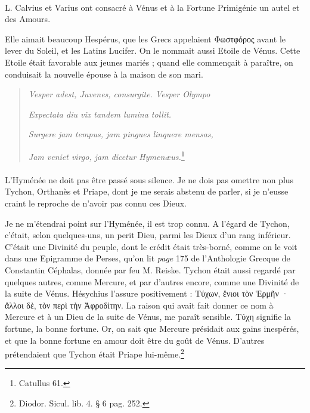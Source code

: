 \documentclass[a4paper, 11pt, oneside, polutonikogreek, french]{article}
\begin{document}
\paragraph{}
L. Calvius et Varius ont consacré à Vénus et à la Fortune Primigénie un autel et des Amours.

Elle aimait beaucoup Hespérus, que les Grecs appelaient Φωστφόρος avant le lever du Soleil, et les Latins Lucifer. On le nommait aussi Etoile de Vénus. Cette Etoile était favorable aux jeunes mariés ; quand elle commençait à paraître, on conduisait la nouvelle épouse à la maison de son mari.
\begin{quotation}
\emph{Vesper adest, Juvenes, consurgite. Vesper Olympo}

\emph{Expectata diu vix tandem lumina tollit.}

\emph{Surgere jam tempus, jam pingues linquere mensas,}

\emph{Jam veniet virgo, jam dicetur Hymenæus.}\footnote{Catullus 61.}
\end{quotation}
\paragraph{}
L'Hyménée ne doit pas être passé sous silence. Je ne dois pas omettre non plus Tychon, Orthanès et Priape, dont je me serais abstenu de parler, si je n'eusse craint le reproche de n'avoir pas connu ces Dieux.

Je ne m'étendrai point sur l'Hyménée, il est trop connu. A l'égard de Tychon, c'était, selon quelques-uns, un perit Dieu, parmi les Dieux d'un rang inférieur. C'était une Divinité du peuple, dont le crédit était très-borné, comme on le voit dans une Epigramme de Perses, qu'on lit \emph{page} 175 de l'Anthologie Grecque de Constantin Céphalas, donnée par feu M. Reiske. Tychon était aussi regardé par quelques autres, comme Mercure, et par d'autres encore, comme une Divinité de la suite de Vénus. Hésychius l'assure positivement : Τύχων, ἔνιοι τὸν Ἑρμῆν · ἄλλοι δὲ, τὸν περὶ τὴν Ἀφροδίτην. La raison qui avait fait donner ce nom à Mercure et à un Dieu de la suite de Vénus, me paraît sensible. Τύχη signifie la fortune, la bonne fortune. Or, on sait que Mercure présidait aux gains inespérés, et que la bonne fortune en amour doit être du goût de Vénus. D'autres prétendaient que Tychon était Priape lui-même.\footnote{Diodor. Sicul. lib. 4. § 6 pag. 252.}
\end{document}
